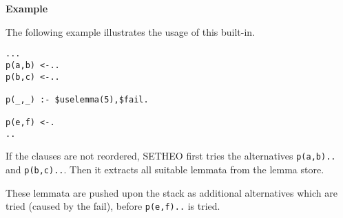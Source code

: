 \vspace*{0.5cm}
\noindent
{\bf Example}
 
The following example illustrates the usage of this built-in.
\begin{verbatim}
...
p(a,b) <-..
p(b,c) <-..
 
p(_,_) :- $uselemma(5),$fail.
 
p(e,f) <-.
..
\end{verbatim}
 
If the clauses are not reordered, SETHEO first tries the alternatives
{\tt p(a,b)..} and {\tt p(b,c)..}.
Then it extracts all suitable lemmata from the lemma store.
 
These lemmata are pushed upon the stack as additional alternatives
which are tried (caused by the fail), before {\tt p(e,f)..} is tried.

